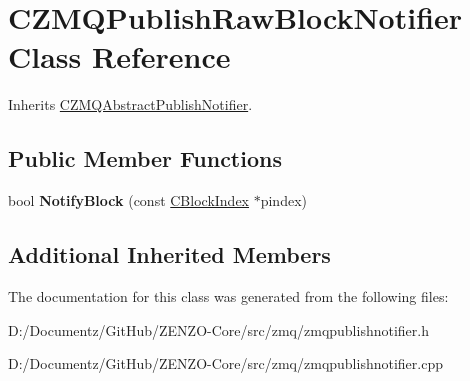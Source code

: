 \hypertarget{class_c_z_m_q_publish_raw_block_notifier}{}\section{C\+Z\+M\+Q\+Publish\+Raw\+Block\+Notifier Class Reference}
\label{class_c_z_m_q_publish_raw_block_notifier}


Inherits \mbox{\hyperlink{class_c_z_m_q_abstract_publish_notifier}{C\+Z\+M\+Q\+Abstract\+Publish\+Notifier}}.

\subsection*{Public Member Functions}
\begin{DoxyCompactItemize}
\item 
\mbox{\label{class_c_z_m_q_publish_raw_block_notifier_a738539ca93e4ae80f283cd3ad8e949d9}} 
bool {\bfseries Notify\+Block} (const \mbox{\hyperlink{class_c_block_index}{C\+Block\+Index}} $\ast$pindex)
\end{DoxyCompactItemize}
\subsection*{Additional Inherited Members}


The documentation for this class was generated from the following files\+:\begin{DoxyCompactItemize}
\item 
D\+:/\+Documentz/\+Git\+Hub/\+Z\+E\+N\+Z\+O-\/\+Core/src/zmq/zmqpublishnotifier.\+h\item 
D\+:/\+Documentz/\+Git\+Hub/\+Z\+E\+N\+Z\+O-\/\+Core/src/zmq/zmqpublishnotifier.\+cpp\end{DoxyCompactItemize}
